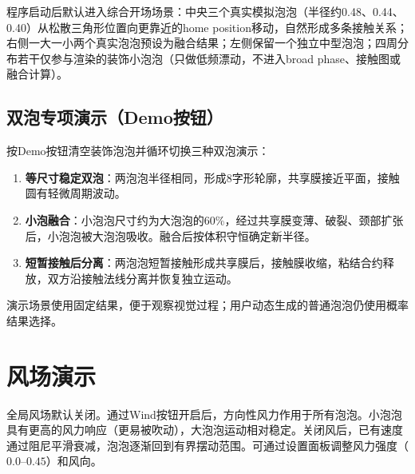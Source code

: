 程序启动后默认进入综合开场场景：中央三个真实模拟泡泡（半径约0.48、0.44、0.40）从松散三角形位置向更靠近的home position移动，自然形成多条接触关系；右侧一大一小两个真实泡泡预设为融合结果；左侧保留一个独立中型泡泡；四周分布若干仅参与渲染的装饰小泡泡（只做低频漂动，不进入broad phase、接触图或融合计算）。

\subsection{双泡专项演示（Demo按钮）}

按Demo按钮清空装饰泡泡并循环切换三种双泡演示：

\begin{enumerate}
  \item \textbf{等尺寸稳定双泡}：两泡泡半径相同，形成8字形轮廓，共享膜接近平面，接触圆有轻微周期波动。
  \item \textbf{小泡融合}：小泡泡尺寸约为大泡泡的60\%，经过共享膜变薄、破裂、颈部扩张后，小泡泡被大泡泡吸收。融合后按体积守恒确定新半径。
  \item \textbf{短暂接触后分离}：两泡泡短暂接触形成共享膜后，接触膜收缩，粘结合约释放，双方沿接触法线分离并恢复独立运动。
\end{enumerate}

演示场景使用固定结果，便于观察视觉过程；用户动态生成的普通泡泡仍使用概率结果选择。

\section{风场演示}

全局风场默认关闭。通过Wind按钮开启后，方向性风力作用于所有泡泡。小泡泡具有更高的风力响应（更易被吹动），大泡泡运动相对稳定。关闭风后，已有速度通过阻尼平滑衰减，泡泡逐渐回到有界摆动范围。可通过设置面板调整风力强度（$0.0$--$0.45$）和风向。
